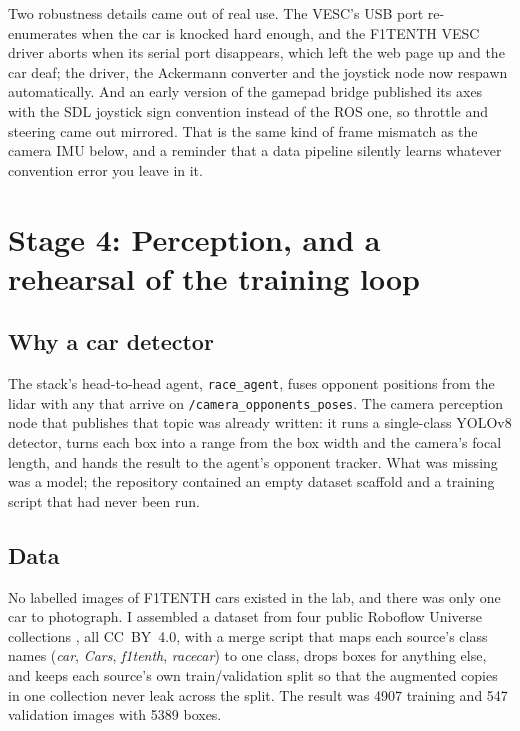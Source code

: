 \documentclass[12pt]{article}
\begin{document}
Two robustness details came out of real use. The VESC's USB port re-enumerates when the
car is knocked hard enough, and the F1TENTH VESC driver aborts when its serial port
disappears, which left the web page up and the car deaf; the driver, the Ackermann
converter and the joystick node now respawn automatically. And an early version of the
gamepad bridge published its axes with the SDL joystick sign convention instead of the
ROS one, so throttle and steering came out mirrored. That is the same kind of frame
mismatch as the camera IMU below, and a reminder that a data pipeline silently learns
whatever convention error you leave in it.

\section*{Stage 4: Perception, and a rehearsal of the training loop}

\subsection*{Why a car detector}

The stack's head-to-head agent, \texttt{race\_agent}, fuses opponent positions from the
lidar with any that arrive on \texttt{/camera\_opponents\_poses}. The camera perception
node that publishes that topic was already written: it runs a single-class YOLOv8
detector, turns each box into a range from the box width and the camera's focal length,
and hands the result to the agent's opponent tracker. What was missing was a model; the
repository contained an empty dataset scaffold and a training script that had never been
run.

\subsection*{Data}

No labelled images of F1TENTH cars existed in the lab, and there was only one car to
photograph. I assembled a dataset from four public Roboflow Universe collections
\cite{rf_f1tenthcars, rf_curc, rf_f110, rf_curobotics}, all CC~BY~4.0, with a merge
script that maps each source's class names (\emph{car}, \emph{Cars}, \emph{f1tenth},
\emph{racecar}) to one class, drops boxes for anything else, and keeps each source's own
train/validation split so that the augmented copies in one collection never leak across
the split. The result was 4907 training and 547 validation images with 5389 boxes.
\end{document}

